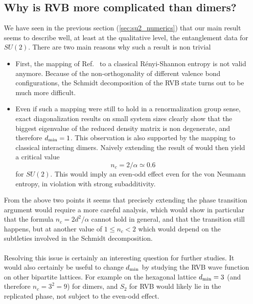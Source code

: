 \documentclass[11pt]{iopart}
\begin{document}
\subsection{Why is RVB more complicated than dimers?}
We have seen in the previous section (\ref{sec:su2_numerics}) that our main result seems to describe well, at least at the qualitative level, the entanglement data for $SU(2)$. There are two main reasons why such a result is non trivial
\begin{itemize}
 \item First, the mapping of Ref.~\cite{Shannonee} to a classical R\'enyi-Shannon entropy is not valid anymore. Because of the non-orthogonality of different valence bond configurations, the Schmidt decomposition of the RVB state turns out to be much more difficult.  
 \item Even if such a mapping were still to hold in a renormalization group sense, exact diagonalization results on small system sizes clearly show that the biggest eigenvalue of the reduced density matrix is non degenerate, and therefore $d_{\rm min}=1$. This observation is also supported by the mapping to classical interacting dimers\cite{Damle}. Naively extending the result of \cite{Stephan2011} would then yield a critical value
 \begin{equation}
n_c=2/\alpha\simeq 0.6  
 \end{equation}
for $SU(2)$. This would imply an even-odd effect even for the von Neumann entropy, in violation with strong subadditivity\cite{Strongsubadditivity}.
\end{itemize}
From the above two points it seems that precisely extending the phase transition argument would require a more careful analysis, which would show in particular that the formula $n_c=2d^2/\alpha$ cannot hold in general, and that the transition still happens, but at another value of $1\leq n_c<2$ which would depend on the subtleties involved in the Schmidt decomposition. 
\paragraph{}Resolving this issue is certainly an interesting question for further studies. It would also certainly be useful to change $d_{\rm min}$ by studying the RVB wave function on other bipartite lattices. For example on the hexagonal lattice $d_{\rm min}=3$ (and therefore $n_c=3^2=9$) for dimers, and $S_2$ for RVB would likely lie in the replicated phase, not subject to the even-odd effect. 
\end{document}
